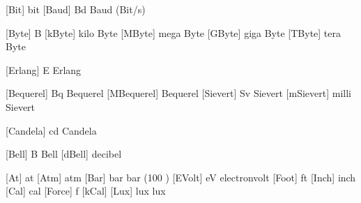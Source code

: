 \setuplabeltext
  [\s!de]
  [u:vac=Wechselspannung,
   u:vdc=Gleichspannung]

\setuplabeltext
  [\s!hr]
  [u:vac=izmjeni\ccaron ni napon,
   u:vdc=istosmjerni napon]

\setuplabeltext
  [\s!it]
  [u:vac=corrente alternata,
   u:vdc=corrente continua]


 [Bit]   {bit}       {}
 [Baud]  {Bd}        {Baud (Bit/s)}


 [Byte]  {B}           {}
 [kByte] {\Kilo \Byte} {kilo Byte}
 [MByte] {\Mega \Byte} {mega Byte}
 [GByte] {\Giga \Byte} {giga Byte}
 [TByte] {\Tera \Byte} {tera Byte}

\setuplabeltext
  [\s!en]
  [u:bit=Bit,
   u:byte=Byte]

\setuplabeltext
  [\s!hr]
  [u:bit=bit,
   u:byte=bajt]


 [Erlang] {E}          {Erlang}


 [Bequerel]  {Bq}              {Bequerel}
 [MBequerel] {\Mega \Bequerel} {Bequerel}
 [Sievert]   {Sv}              {Sievert}
 [mSievert]  {\Milli \Sievert} {milli Sievert}


 [Candela] {cd} {Candela}


 [Bell]  {B}           {Bell}
 [dBell] {\Deci \Bell} {decibel}


 [At]    {at}         {}
 [Atm]   {atm}        {}
 [Bar]   {bar}        {bar (100 \Kilo \Pascal)}
 [EVolt] {eV}         {electronvolt}
 [Foot]  {ft}         {}
 [Inch]  {inch}       {}
 [Cal]   {cal}        {}
 [Force] {f}          {}
 [kCal]  {\Kilo \Cal} {}
 [Lux]   {lux}        {lux}


